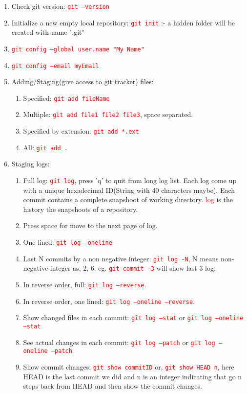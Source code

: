 \documentclass[10 pt]{article}
\newcommand{\R}{\textcolor{red}} %
\newcommand{\T}{\texttt}
\begin{document}
\begin{enumerate}
	\item Check git version: \R{\T{git --version}}
	\item Initialize a new empty local repository: \R{\T{git init}} :- a hidden folder will be created with name ".git"
	\item \R{\T{git config --global user.name "My Name"}}
	\item \R{\T{git config --email myEmail}}
	\item Adding/Staging(give access to git tracker) files:
		\begin{enumerate}
			\item Specified: \R{\T{git add fileName}}
			\item Multiple: \R{\T{git add file1 file2 file3}}, space separated.
			\item Specified by extension: \R{\T{git add *.ext}}
			\item All: \R{\T{git add .}}
		\end{enumerate}
	\item Staging logs:
		\begin{enumerate}
			\item Full log: \R{\T{git log}}, press 'q' to quit from long log list. Each log come up with a unique hexadecimal ID(String with 40 characters maybe). Each commit contains a complete snapshoot of working directory. \R{log} is the history the snapshoots of a repository.
			\item Press space for move to the next page of log.
			\item One lined: \R{\T{git log --oneline}}
			\item Last N commits by a non negative integer: \R{\T{git log -N}}, N means non-negative integer as, 2, 6. eg. \R{\T{git commit -3}} will show last 3 log.
			\item In reverse order, full: \R{\T{git log --reverse}}.
			\item In reverse order, one lined: \R{\T{git log --oneline --reverse}}.
			\item Show changed files in each commit: \R{\T{git log --stat}} or \R{\T{git log --oneline --stat}}
			\item See actual changes in each commit: \R{\T{git log --patch}} or \R{\T{git log --oneline --patch}}
			\item Show commit changes: \R{\T{git show commitID}} or, \R{\T{git show HEAD~n}}, here HEAD is the last commit we did and n is an integer indicating that go n steps back from HEAD and then show the commit changes.

\end{enumerate}
\end{enumerate}
\end{document}
